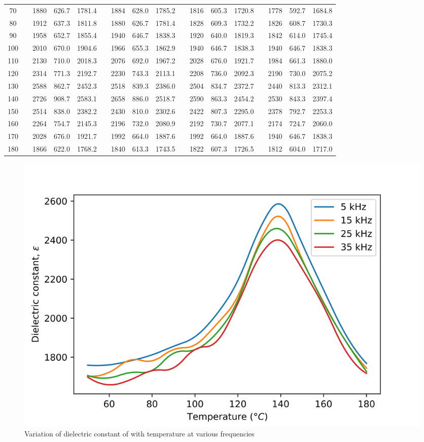 \documentclass[%
 aip,
 amsmath,amssymb,
 reprint, floatfix%
]{revtex4-1}
\begin{document}
\begin{table}[]
\begin{tabular}{@{}ccccccccccccccccc@{}}
    70 &  & 1880 & 626.7 & 1781.4 &  & 1884 & 628.0 & 1785.2 &  & 1816 & 605.3 & 1720.8 &  & 1778 & 592.7 & 1684.8 \\
    80 &  & 1912 & 637.3 & 1811.8 &  & 1880 & 626.7 & 1781.4 &  & 1828 & 609.3 & 1732.2 &  & 1826 & 608.7 & 1730.3 \\
    90 &  & 1958 & 652.7 & 1855.4 &  & 1940 & 646.7 & 1838.3 &  & 1920 & 640.0 & 1819.3 &  & 1842 & 614.0 & 1745.4 \\
    100 &  & 2010 & 670.0 & 1904.6 &  & 1966 & 655.3 & 1862.9 &  & 1940 & 646.7 & 1838.3 &  & 1940 & 646.7 & 1838.3 \\
    110 &  & 2130 & 710.0 & 2018.3 &  & 2076 & 692.0 & 1967.2 &  & 2028 & 676.0 & 1921.7 &  & 1984 & 661.3 & 1880.0 \\
    120 &  & 2314 & 771.3 & 2192.7 &  & 2230 & 743.3 & 2113.1 &  & 2208 & 736.0 & 2092.3 &  & 2190 & 730.0 & 2075.2 \\
    130 &  & 2588 & 862.7 & 2452.3 &  & 2518 & 839.3 & 2386.0 &  & 2504 & 834.7 & 2372.7 &  & 2440 & 813.3 & 2312.1 \\
    140 &  & 2726 & 908.7 & 2583.1 &  & 2658 & 886.0 & 2518.7 &  & 2590 & 863.3 & 2454.2 &  & 2530 & 843.3 & 2397.4 \\
    150 &  & 2514 & 838.0 & 2382.2 &  & 2430 & 810.0 & 2302.6 &  & 2422 & 807.3 & 2295.0 &  & 2378 & 792.7 & 2253.3 \\
    160 &  & 2264 & 754.7 & 2145.3 &  & 2196 & 732.0 & 2080.9 &  & 2192 & 730.7 & 2077.1 &  & 2174 & 724.7 & 2060.0 \\
    170 &  & 2028 & 676.0 & 1921.7 &  & 1992 & 664.0 & 1887.6 &  & 1992 & 664.0 & 1887.6 &  & 1940 & 646.7 & 1838.3 \\
    180 &  & 1866 & 622.0 & 1768.2 &  & 1840 & 613.3 & 1743.5 &  & 1822 & 607.3 & 1726.5 &  & 1812 & 604.0 & 1717.0 \\ \bottomrule
    \end{tabular}
    \end{table}
    
    \begin{figure}
        \centering
        \includegraphics[scale = 0.56]{Figures/plot-curie.png}
        \caption{Variation of dielectric constant of  with temperature at various frequencies}
        \label{fig:curie}
    \end{figure}
\end{document}
